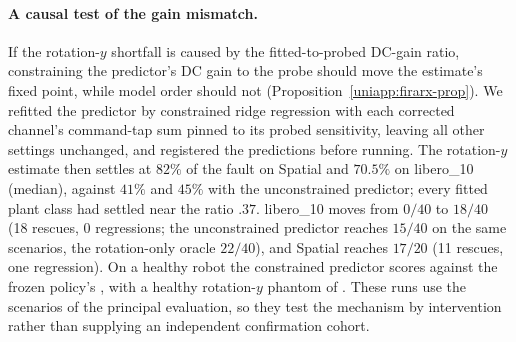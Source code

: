 \paragraph{A causal test of the gain mismatch.}
If the rotation-$y$ shortfall is caused by the fitted-to-probed DC-gain ratio, constraining the
predictor's DC gain to the probe should move the estimate's fixed point, while model order should
not (Proposition~\ref{uniapp:firarx-prop}). We refitted the predictor by constrained ridge regression
with each corrected channel's command-tap sum pinned to its probed sensitivity, leaving all other
settings unchanged, and registered the predictions before running. The rotation-$y$ estimate then
settles at $82\%$ of the fault on Spatial and $70.5\%$ on libero\_10 (median), against $41\%$ and
$45\%$ with the unconstrained predictor; every fitted plant class had settled near the ratio
$.37$. libero\_10 moves from $0/40$ to $18/40$ (18 rescues, 0 regressions; the unconstrained predictor
reaches $15/40$ on the same scenarios, the rotation-only oracle $22/40$), and Spatial reaches $17/20$
(11 rescues, one regression). On a healthy robot the constrained predictor scores \PENDING{} against
the frozen policy's \PENDING{}, with a healthy rotation-$y$ phantom of \PENDING. These runs use the
scenarios of the principal evaluation, so they test the mechanism by intervention rather than
supplying an independent confirmation cohort.
